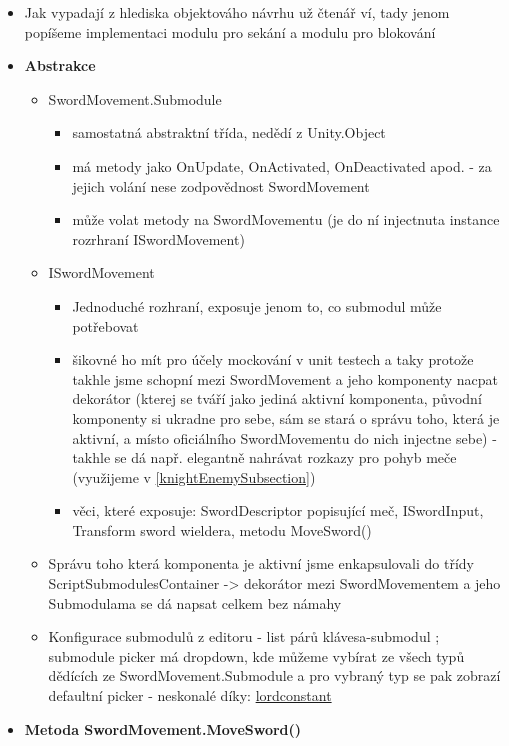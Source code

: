 \begin{itemize}
  
\item Jak vypadají z hlediska objektováho návrhu už čtenář ví, tady jenom popíšeme implementaci modulu pro sekání a modulu pro blokování
\item \textbf{Abstrakce} 
  \begin{itemize}
    \item SwordMovement.Submodule
      \begin{itemize}
        \item samostatná abstraktní třída, nedědí z Unity.Object
        \item má metody jako OnUpdate, OnActivated, OnDeactivated apod. - za jejich volání nese zodpovědnost SwordMovement
        \item může volat metody na SwordMovementu (je do ní injectnuta instance rozrhraní ISwordMovement)
      \end{itemize}
    \item ISwordMovement
      \begin{itemize}
        \item Jednoduché rozhraní, exposuje jenom to, co submodul může potřebovat
        \item šikovné ho mít pro účely mockování v unit testech a taky protože takhle jsme schopní mezi SwordMovement a jeho komponenty nacpat dekorátor (kterej se tváří jako jediná aktivní komponenta, původní komponenty si ukradne pro sebe, sám se stará o správu toho, která je aktivní, a místo oficiálního SwordMovementu do nich injectne sebe) - takhle se dá např. elegantně nahrávat rozkazy pro pohyb meče (využijeme v \ref{knightEnemySubsection})
        \item věci, které exposuje: SwordDescriptor popisující meč, ISwordInput, Transform sword wieldera, metodu MoveSword()
      \end{itemize}
    \item Správu toho která komponenta je aktivní jsme enkapsulovali do třídy ScriptSubmodulesContainer -> dekorátor mezi SwordMovementem a jeho Submodulama se dá napsat celkem bez námahy
    \item Konfigurace submodulů z editoru - list párů klávesa-submodul ; submodule picker má dropdown, kde můžeme vybírat ze všech typů dědících ze SwordMovement.Submodule a pro vybraný typ se pak zobrazí defaultní picker - neskonalé díky: \href{https://github.com/lordconstant/SubclassPropertyDrawer}{lordconstant}
  \end{itemize}
\item \textbf{Metoda SwordMovement.MoveSword()} \label{swordMovementMoveSwordImplementationSubsection}

\end{itemize}
